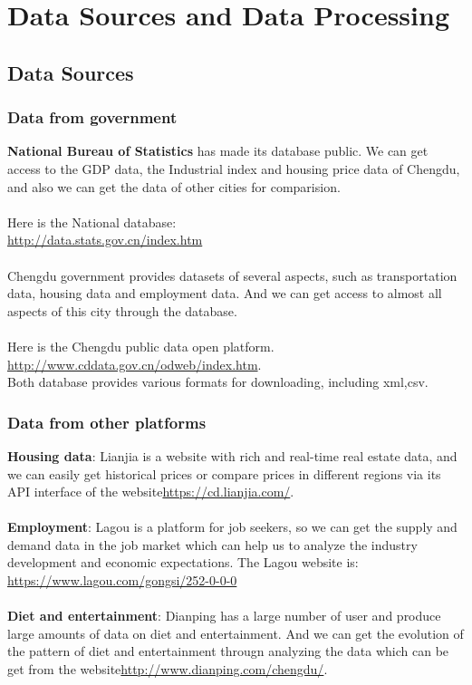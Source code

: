 \documentclass{article}
\begin{document}
\section{Data Sources and Data Processing}
\subsection{Data Sources}
\subsubsection*{Data from government}
\textbf{National Bureau of Statistics} has made its database public. We can get access to the GDP data, the Industrial index and housing price data of Chengdu, and also we can get the data of other cities for comparision.
\\
\\
Here is the National database:\\
\url{http://data.stats.gov.cn/index.htm}
\\
\\
Chengdu government provides datasets of several aspects, such as transportation data, housing data and employment data. And we can get access to almost all aspects of this city through the database.
\\
\\
Here is the Chengdu public data open platform.\\
\url{http://www.cddata.gov.cn/odweb/index.htm}.\\
Both database provides various formats for downloading, including \textmd{xml,csv}.
\subsubsection*{Data from other platforms}
\textbf{Housing data}: Lianjia is a website with rich and real-time real estate data, and we can easily get historical prices or compare prices in different regions via its API interface of the website\url{https://cd.lianjia.com/}.
\\
\\
\textbf{Employment}: Lagou is a platform for job seekers, so we can get the supply and demand data in the job market which can help us to analyze the industry development and economic expectations. The Lagou website is:\\
\url{https://www.lagou.com/gongsi/252-0-0-0}
\\
\\
\textbf{Diet and entertainment}: Dianping has a large number of user and produce large amounts of data on diet and entertainment. And we can get the evolution of the pattern of diet and entertainment througn analyzing the data which can be get from the website\url{http://www.dianping.com/chengdu/}.
\end{document}
